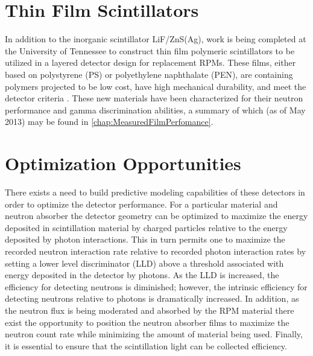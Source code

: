 \section{Thin Film Scintillators}
\label{sec:DevelopedScintillators}
In addition to the inorganic scintillator LiF/ZnS(Ag), work is being completed at the University of Tennessee to construct thin film polymeric scintillators to be utilized in a layered detector design for replacement RPMs.
These films, either based on polystyrene (PS) or polyethylene naphthalate (PEN), are  containing polymers projected to be low cost, have high mechanical durability, and meet the detector criteria \cite{Sen_Composites,Mabe201329}.
These new materials have been characterized for their neutron performance and gamma discrimination abilities, a summary of which (as of May 2013) may be found in \autoref{chap:MeasuredFilmPerfomance}.
\section{Optimization Opportunities}
There exists a need to build predictive modeling capabilities of these detectors in order to optimize the detector performance.
For a particular material and neutron absorber the detector geometry can be optimized to maximize the energy deposited in scintillation material by charged particles relative to the energy deposited by photon interactions. 
This in turn permits one to maximize the recorded neutron interaction rate relative to recorded photon interaction rates by setting a lower level discriminator (LLD) above a threshold associated with energy deposited in the detector by photons.  
As the LLD is increased, the efficiency for detecting neutrons is diminished; however, the intrinsic efficiency for detecting neutrons relative to photons is dramatically increased. 
In addition, as the neutron flux is being moderated and absorbed by the RPM material there exist the opportunity to position the neutron absorber films to maximize the neutron count rate while minimizing the amount of material being used.
Finally, it is essential to ensure that the scintillation light can be collected efficiency.

